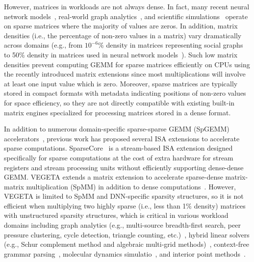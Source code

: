 However, matrices in workloads are not always dense. In fact, many recent
neural network
models~\cite{reddi-mlperf-isca2020,naumov-dnn-model-arxiv2019,han-deep-compress-arxiv2015,jouppi-datacenter-isca2017,wu-ml-facebook-hpca2019},
real-world graph
analytics~\cite{davis-graphblas-tmos2019,hoefler2011generic,shun-multicore-tc-2015},
and scientific
simulations~\cite{canning-sparse-sim-1996,galli-quantum-sim-1996} operate
on sparse matrices where the majority of values are zeros. In addition,
matrix densities (i.e., the percentage of non-zero values in a matrix)
vary dramatically across domains (e.g., from $10^{-6}\%$ density in
matrices representing social graphs to 50\% density in matrices used in
neural network models~\cite{hegde-extensor-micro2019}). Such low matrix
densities prevent computing GEMM for sparse matrices efficiently on CPUs
using the recently introduced matrix extensions since most
multiplications will involve at least one input value which is zero.
Moreover, sparse matrices are typically stored in compact formats with
metadata indicating positions of non-zero values for space efficiency, so
they are not directly compatible with existing built-in matrix engines
specialized for processing matrices stored in a dense format.


In addition to numerous domain-specific sparse-sparse GEMM (SpGEMM)
accelerators~\cite{qin-sigma-hpca2020, hegde-extensor-micro2019,
  zhang-sparch-hpca2020, srivastava-matraptor-micro2020,
  zhang-gamma-asplos2021}, previous work has proposed several ISA
extensions to accelerate sparse computations.
SparseCore~\cite{rao-sparsecore-asplos2022} is a stream-based ISA
extension designed specifically for sparse computations at the cost of
extra hardware for stream registers and stream processing units without
efficiently supporting dense-dense GEMM. VEGETA extends a matrix
extension to accelerate sparse-dense matrix-matrix multiplication (SpMM)
in addition to dense computations~\cite{jeong-vegeta-hpca2023}. However,
VEGETA is limited to SpMM and DNN-specific sparsity structures, so it is
not efficient when multiplying two highly sparse (i.e., less than 1\%
density) matrices with unstructured sparsity structures, which is critical in
various workload domains including graph analytics (e.g., multi-source
breadth-first search, peer pressure clustering, cycle detection, triangle
counting,
etc.)~\cite{dalberto-all-pair-spgemm-2007,shah-graph-spgemm-2007,rabin-maximum-matching-alg-1989,azad-triangle-count-2015},
hybrid linear solvers (e.g., Schur complement method and algebraic multi-grid
methods)~\cite{yamazaki-spgemm-schur-2010}, context-free grammar
parsing~\cite{penn-context-free-grammar-2006}, molecular dynamics
simulatio~\cite{itoh-order-n-spgemm-1995}, and interior point
methods~\cite{karypis-interior-point-alg-1994}.

